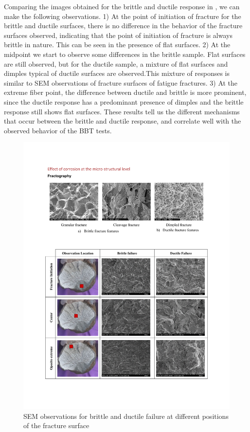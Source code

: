 Comparing the images obtained for the brittle and ductile response in , we can make the following observations. 1) At the point of initiation of fracture for the brittle and ductile surfaces, there is no difference in the behavior of the fracture surfaces observed, indicating that the point of initiation of fracture is always brittle in nature. This can be seen in the presence of flat surfaces. 2) At the midpoint we start to observe some differences in the brittle sample. Flat surfaces are still observed, but for the ductile sample, a mixture of flat surfaces and dimples typical of ductile surfaces are observed.This mixture of responses is similar to SEM observations of fracture surfaces of fatigue fractures. 3) At the extreme fiber point, the difference between ductile and brittle is more prominent, since the ductile response has a predominant presence of dimples and the brittle response still shows flat surfaces. These results tell us the different mechanisms that occur between the brittle and ductile response, and correlate well with the observed behavior of the BBT tests.

\begin{figure}[htbp]
	\centering
	\includegraphics[width=1\textwidth]{VAC Thesis 2.0/Chapter-4/figs/BBT_fractography.pdf}
	\caption{SEM observations for brittle and ductile failure at different positions of the fracture surface}
	\label{fig:FractureSurfaces}
\end{figure}

